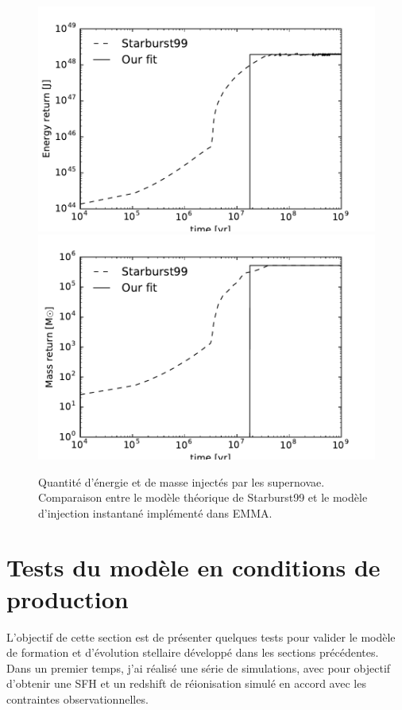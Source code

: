 \begin{figure}
        \includegraphics[width=.95\textwidth]{img/03/energy_loss.pdf} 
		\includegraphics[width=.95\textwidth]{img/03/mass_loss.pdf} 
        \caption[Calibration des supernovæ]{ Quantité d'énergie et de masse injectés par les supernovae. 
        Comparaison entre le modèle théorique de Starburst99 et le modèle d'injection instantané implémenté dans EMMA.
 		\label{fig:SNloss}}
\end{figure}


\section{Tests du modèle en conditions de production}

L'objectif de cette section est de présenter quelques tests pour valider le modèle de formation et d'évolution stellaire développé dans les sections précédentes.
Dans un premier temps, j'ai réalisé une série de simulations, avec pour objectif d'obtenir une \ac{SFH} et un redshift de réionisation simulé en accord avec les contraintes observationnelles.

